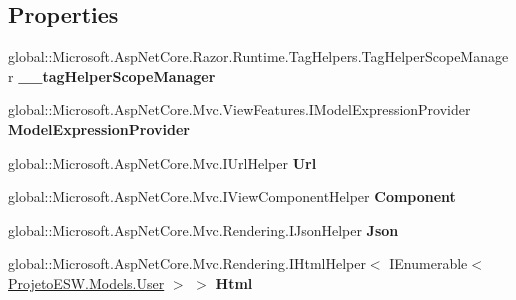 \subsection*{Properties}
\begin{DoxyCompactItemize}
\item 
\mbox{\label{class_asp_net_core_1_1_views___user___index_abd641a64d956ad7ddf4f5ae01e46fbf0}} 
global\+::\+Microsoft.\+Asp\+Net\+Core.\+Razor.\+Runtime.\+Tag\+Helpers.\+Tag\+Helper\+Scope\+Manager {\bfseries \+\_\+\+\_\+tag\+Helper\+Scope\+Manager}
\item 
\mbox{\label{class_asp_net_core_1_1_views___user___index_a00c6c4f3811135cfd90109a94248f880}} 
global\+::\+Microsoft.\+Asp\+Net\+Core.\+Mvc.\+View\+Features.\+I\+Model\+Expression\+Provider {\bfseries Model\+Expression\+Provider}
\item 
\mbox{\label{class_asp_net_core_1_1_views___user___index_a9db7d4be901a360294601f2a79096e19}} 
global\+::\+Microsoft.\+Asp\+Net\+Core.\+Mvc.\+I\+Url\+Helper {\bfseries Url}
\item 
\mbox{\label{class_asp_net_core_1_1_views___user___index_aa664d29c8f0663e99729c6e1b4ce061d}} 
global\+::\+Microsoft.\+Asp\+Net\+Core.\+Mvc.\+I\+View\+Component\+Helper {\bfseries Component}
\item 
\mbox{\label{class_asp_net_core_1_1_views___user___index_a49eb8389bb8b780b1e9498327d4dedad}} 
global\+::\+Microsoft.\+Asp\+Net\+Core.\+Mvc.\+Rendering.\+I\+Json\+Helper {\bfseries Json}
\item 
\mbox{\label{class_asp_net_core_1_1_views___user___index_af33368238ba9a0909fcfd316381b2840}} 
global\+::\+Microsoft.\+Asp\+Net\+Core.\+Mvc.\+Rendering.\+I\+Html\+Helper$<$ I\+Enumerable$<$ \mbox{\hyperlink{class_projeto_e_s_w_1_1_models_1_1_user}{Projeto\+E\+S\+W.\+Models.\+User}} $>$ $>$ {\bfseries Html}
\end{DoxyCompactItemize}
